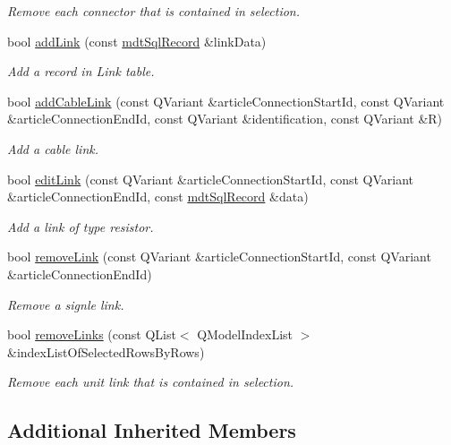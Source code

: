 \begin{DoxyCompactItemize}
\begin{DoxyCompactList}\small\item\em Remove each connector that is contained in selection. \end{DoxyCompactList}\item 
bool \hyperlink{classmdt_cl_article_aa438fa2c759a091341eea76ffda6eef3}{add\-Link} (const \hyperlink{classmdt_sql_record}{mdt\-Sql\-Record} \&link\-Data)
\begin{DoxyCompactList}\small\item\em Add a record in Link table. \end{DoxyCompactList}\item 
bool \hyperlink{classmdt_cl_article_a0ed8ad64cafb5b69c1f83875818136e5}{add\-Cable\-Link} (const Q\-Variant \&article\-Connection\-Start\-Id, const Q\-Variant \&article\-Connection\-End\-Id, const Q\-Variant \&identification, const Q\-Variant \&R)
\begin{DoxyCompactList}\small\item\em Add a cable link. \end{DoxyCompactList}\item 
bool \hyperlink{classmdt_cl_article_a3c627720a87e6003bb78c0727ec2ba64}{edit\-Link} (const Q\-Variant \&article\-Connection\-Start\-Id, const Q\-Variant \&article\-Connection\-End\-Id, const \hyperlink{classmdt_sql_record}{mdt\-Sql\-Record} \&data)
\begin{DoxyCompactList}\small\item\em Add a link of type resistor. \end{DoxyCompactList}\item 
bool \hyperlink{classmdt_cl_article_a4e26282c7605f756519050fee3858134}{remove\-Link} (const Q\-Variant \&article\-Connection\-Start\-Id, const Q\-Variant \&article\-Connection\-End\-Id)
\begin{DoxyCompactList}\small\item\em Remove a signle link. \end{DoxyCompactList}\item 
bool \hyperlink{classmdt_cl_article_ae2dda20b31bafbc1ee6dcce1db1134c7}{remove\-Links} (const Q\-List$<$ Q\-Model\-Index\-List $>$ \&index\-List\-Of\-Selected\-Rows\-By\-Rows)
\begin{DoxyCompactList}\small\item\em Remove each unit link that is contained in selection. \end{DoxyCompactList}\end{DoxyCompactItemize}
\subsection*{Additional Inherited Members}


